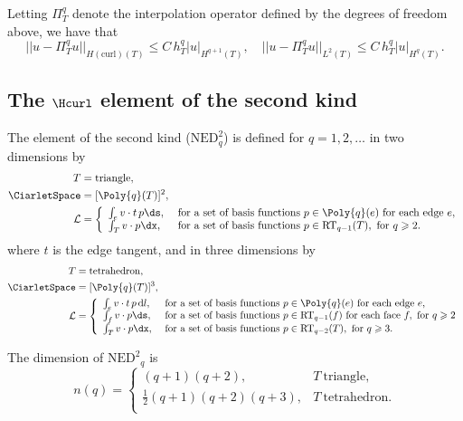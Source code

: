 Letting $\Pi_T^q$ denote the interpolation operator defined by the
degrees of freedom above, we have that \citep[Theorem 2]{Nedelec1980}
\begin{equation}
  ||u - \Pi_T^q u||_{H(\mathrm{curl})(T)} \leqslant C \, h_T^{q} |u|_{H^{q+1}(T)},
  \quad
  ||u - \Pi_T^q u||_{L^2(T)} \leqslant C \, h_T^{q} |u|_{H^{q}(T)}.
\end{equation}

\subsection{The $\Hcurl$ \nedelec{} element of the second kind}
\label{sec:nedelec:second}

\begin{definition}
  The \nedelec{} element of the second kind ($\mathrm{NED}^2_q$) is
  defined for $q = 1, 2, \dots$ in two dimensions by
  \begin{align}
    T &= \mathrm{triangle}, \\
    \CiarletSpace &= [\Poly{q}(T)]^2, \\
    \mathcal{L} &=
    \left \{
    \begin{array}{ll}
      \int_{e} v \cdot t \, p \ds,
      &\text{ for a set of basis functions }p \in \Poly{q}(e)
      \text{ for each edge } e,  \\
      \int_{T} v \cdot p \dx,
      &\text{ for a set of basis functions } p \in \mathrm{RT}_{q-1}(T),
      \text{ for } q \geqslant 2. \\
    \end{array}
    \right .
  \end{align}
  where $t$ is the edge tangent, and in three dimensions by
  \begin{align}
    T &= \mathrm{tetrahedron}, \\
    \CiarletSpace &= [\Poly{q}(T)]^3, \\
    \mathcal{L} &=
    \left \{
    \begin{array}{ll}
      \int_{e} v \cdot t \, p \, \mathrm{d}l,
      &\text{ for a set of basis functions } p \in \Poly{q}(e)
      \text{ for each edge } e, \\
      \int_{f} v \cdot p \ds,
      &\text{ for a set of basis functions } p \in \mathrm{RT}_{q-1}(f)
      \text{ for each face } f, \text{ for } q \geqslant 2 \\
      \int_{T} v \cdot p \dx,
      &\text{ for a set of basis functions } p \in \mathrm{RT}_{q-2}(T),
      \text{ for } q \geqslant 3.
    \end{array}
    \right .
  \end{align}
\end{definition}
The dimension of $\mathrm{NED^2}_q$ is
\begin{equation}
  n(q) = \left \{
    \begin{array}{ll}
      (q + 1)(q + 2), & T~\mathrm{triangle}, \\
      \frac{1}{2} (q + 1)(q + 2)(q + 3), & T~\mathrm{tetrahedron}. \\
    \end{array}
    \right.
\end{equation}

